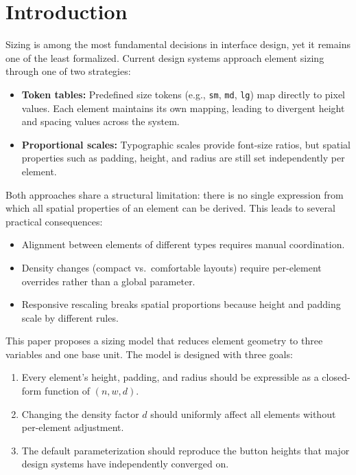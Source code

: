 \section{Introduction}

Sizing is among the most fundamental decisions in interface design, yet it remains one of the least formalized. Current design systems approach element sizing through one of two strategies:

\begin{itemize}
  \item \textbf{Token tables:}
  Predefined size tokens (e.g., \texttt{sm}, \texttt{md}, \texttt{lg}) map directly to pixel values. Each element maintains its own mapping, leading to divergent height and spacing values across the system.

  \item \textbf{Proportional scales:}
  Typographic scales provide font-size ratios, but spatial properties such as padding, height, and radius are still set independently per element.
\end{itemize}

Both approaches share a structural limitation: there is no single expression from which all spatial properties of an element can be derived. This leads to several practical consequences:

\begin{itemize}
  \item Alignment between elements of different types requires manual coordination.
  \item Density changes (compact vs.\ comfortable layouts) require per-element overrides rather than a global parameter.
  \item Responsive rescaling breaks spatial proportions because height and padding scale by different rules.
\end{itemize}

This paper proposes a sizing model that reduces element geometry to three variables and one base unit. The model is designed with three goals:

\begin{enumerate}
  \item Every element's height, padding, and radius should be expressible as a closed-form function of $(n, w, d)$.
  \item Changing the density factor $d$ should uniformly affect all elements without per-element adjustment.
  \item The default parameterization should reproduce the button heights that major design systems have independently converged on.
\end{enumerate}

